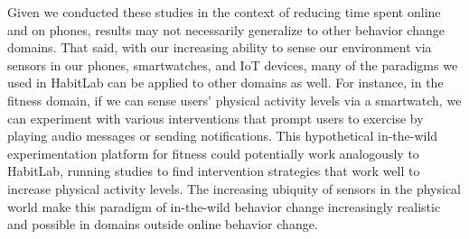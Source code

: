
Given we conducted these studies in the context of reducing time spent online and on phones, results may not necessarily generalize to other behavior change domains. That said, with our increasing ability to sense our environment via sensors in our phones, smartwatches, and IoT devices, many of the paradigms we used in HabitLab can be applied to other domains as well. For instance, in the fitness domain, if we can sense users' physical activity levels via a smartwatch, we can experiment with various interventions that prompt users to exercise by playing audio messages or sending notifications. This hypothetical in-the-wild experimentation platform for fitness could potentially work analogously to HabitLab, running studies to find intervention strategies that work well to increase physical activity levels. The increasing ubiquity of sensors in the physical world make this paradigm of in-the-wild behavior change increasingly realistic and possible in domains outside online behavior change.

